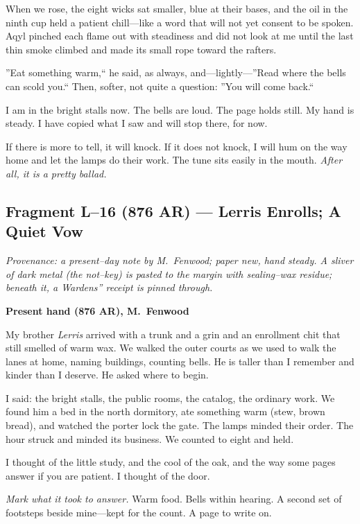 \documentclass[11pt]{article}
\numberwithin{equation}{section} %
\theoremstyle{plain} %
\theoremstyle{definition} %
\theoremstyle{remark} %
\begin{document}
When we rose, the eight wicks sat smaller, blue at their bases, and the oil in the ninth cup held a patient chill---like a word that will not yet consent to be spoken. Aqyl pinched each flame out with steadiness and did not look at me until the last thin smoke climbed and made its small rope toward the rafters.

''Eat something warm,`` he said, as always, and---lightly---''Read where the bells can scold you.`` Then, softer, not quite a question: ''You will come back.``

I am in the bright stalls now. The bells are loud. The page holds still. My hand is steady. I have copied what I saw and will stop there, for now.

If there is more to tell, it will knock. If it does not knock, I will hum on the way home and let the lamps do their work. The tune sits easily in the mouth. \emph{After all, it is a pretty ballad.}

\subsection{Fragment L--16 (876 AR) --- Lerris Enrolls; A Quiet Vow}
\label{frag:l16}

\noindent\textit{Provenance: a present--day note by M.\ Fenwood; paper new, hand steady. A sliver of dark metal (the not--key) is pasted to the margin with sealing--wax residue; beneath it, a Wardens'' receipt is pinned through.}

\medskip
\noindent\textbf{Present hand (876 AR), M.\ Fenwood}

My brother \textit{Lerris} arrived with a trunk and a grin and an enrollment chit that still smelled of warm wax. We walked the outer courts as we used to walk the lanes at home, naming buildings, counting bells. He is taller than I remember and kinder than I deserve. He asked where to begin.

I said: the bright stalls, the public rooms, the catalog, the ordinary work. We found him a bed in the north dormitory, ate something warm (stew, brown bread), and watched the porter lock the gate. The lamps minded their order. The hour struck and minded its business. We counted to eight and held.

I thought of the little study, and the cool of the oak, and the way some pages answer if you are patient. I thought of the door.

\medskip
\noindent\textit{Mark what it took to answer.} Warm food. Bells within hearing. A second set of footsteps beside mine---kept for the count. A page to write on.
\end{document}
